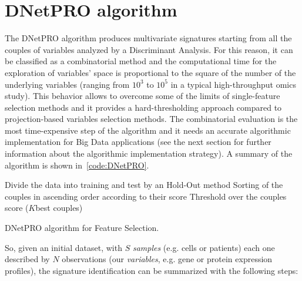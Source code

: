 \documentclass{standalone}
\begin{document}
\section[DNetPRO algorithm]{DNetPRO algorithm}\label{dnetpro:DNetPRO}

The \textsf{DNetPRO} algorithm produces multivariate signatures starting from all the couples of variables analyzed by a Discriminant Analysis.
For this reason, it can be classified as a combinatorial method and the computational time for the exploration of variables' space is proportional to the square of the number of the underlying variables (ranging from $10^3$ to $10^5$ in a typical high-throughput omics study).
This behavior allows to overcome some of the limits of single-feature selection methods and it provides a hard-thresholding approach compared to projection-based variables selection methods.
The combinatorial evaluation is the most time-expensive step of the algorithm and it needs an accurate algorithmic implementation for Big Data applications (see the next section for further information about the algorithmic implementation strategy).
A summary of the algorithm is shown in~\ref{code:DNetPRO}.

\begin{algorithm}[H]
  Divide the data into training and test by an Hold-Out method\;
  Sorting of the couples in ascending order according to their score\;
  Threshold over the couples score ($K$best couples)\;
  \caption{DNetPRO algorithm for Feature Selection.}
  \label{code:DNetPRO}
\end{algorithm}

So, given an initial dataset, with $S$ \emph{samples} (e.g. cells or patients) each one described by $N$ observations (our \emph{variables}, e.g. gene or protein expression profiles), the signature identification can be summarized with the following steps:
\end{document}
